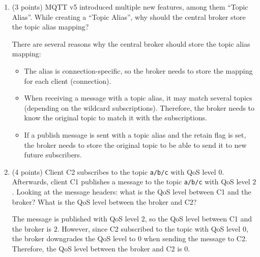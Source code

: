 \documentclass[12pt]{article}
\begin{document}
\begin{ejercicio}[20 points]
\begin{enumerate}[label=\alph*)]
\begin{enumerate}[label=\roman*)]
                Since only the environment temperature of the bathroom is needed, the message from C3 should not be received. Therefore, C4 should subscribe to the topic \verb|bathroom/+/temp|, which will match the topics \verb|bathroom/ceiling/temp| and \verb|bathroom/floor/temp|, but not \verb|bathroom/boiler/outlet/temp|.
                \item (3 points) C1, C2, C3 subscribe to shared subscriptions \verb|\$share/exam/iot/temp|. To which topic should C4 publish, such that C1, C2, or C3 will receive the message?
                
                In this case, \verb|exam| is the group name, and \verb|iot/temp| is the topic. Therefore, C4 should publish to the topic \verb|iot/temp|, so that one of the clients C1, C2, or C3 will receive the message. Since it is a shared subscription, only one of the clients will receive the message.
            \end{enumerate}
            \item (3 points) MQTT v5 introduced multiple new features, among them ``Topic Alias''. While creating a ``Topic Alias'', why should the central broker store the topic alias mapping?
            
            There are several reasons why the central broker should store the topic alias mapping:
            \begin{itemize}
                \item The alias is connection-specific, so the broker needs to store the mapping for each client (connection).
                \item When receiving a message with a topic alias, it may match several topics (depending on the wildcard subscriptions). Therefore, the broker needs to know the original topic to match it with the subscriptions.
                \item If a publish message is sent with a topic alias and the retain flag is set, the broker needs to store the original topic to be able to send it to new future subscribers.
            \end{itemize}
            
            \item (4 points) Client C2 subscribes to the topic \verb|a/b/c| with QoS level $0$. Afterwards, client C1 publishes a message to the topic \verb|a/b/c| with QoS level $2$. Looking at the message headers: what is the QoS level between C1 and the broker? What is the QoS level between the broker and C2?
            
            The message is published with QoS level $2$, so the QoS level between C1 and the broker is $2$. However, since C2 subscribed to the topic with QoS level $0$, the broker downgrades the QoS level to $0$ when sending the message to C2. Therefore, the QoS level between the broker and C2 is $0$.
        \end{enumerate}
    \end{ejercicio}
\end{document}
